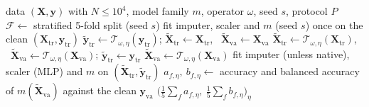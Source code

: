 \documentclass[pdflatex,sn-mathphys]{sn-jnl}
\theoremstyle{thmstyleone}
\theoremstyle{thmstyletwo}
\theoremstyle{thmstylethree}
\begin{document}


\begin{algorithm}[t]
\caption{Evaluation of one trajectory $(\mathcal{D},m,\omega,s)$ under Protocol~A or~B}\label{alg:cell}
\begin{algorithmic}[1]
\Require data $(\mathbf{X},\mathbf{y})$ with $N\le10^{4}$, model family $m$, operator $\omega$, seed $s$, protocol $P$
\State $\mathcal{F}\gets$ stratified 5-fold split (seed $s$)
   \State fit imputer, scaler and $m$ (seed $s$) once on the clean $(\mathbf{X}_{\mathrm{tr}},\mathbf{y}_{\mathrm{tr}})$ \EndIf
      \State $\tilde{\mathbf{y}}_{\mathrm{tr}}\gets\mathcal{T}_{\omega,\eta}(\mathbf{y}_{\mathrm{tr}})$; \quad $\tilde{\mathbf{X}}_{\mathrm{tr}}\gets\mathbf{X}_{\mathrm{tr}}$, \ $\tilde{\mathbf{X}}_{\mathrm{va}}\gets\mathbf{X}_{\mathrm{va}}$
      \State $\tilde{\mathbf{X}}_{\mathrm{tr}}\gets\mathcal{T}_{\omega,\eta}(\mathbf{X}_{\mathrm{tr}})$, \ $\tilde{\mathbf{X}}_{\mathrm{va}}\gets\mathcal{T}_{\omega,\eta}(\mathbf{X}_{\mathrm{va}})$; \quad $\tilde{\mathbf{y}}_{\mathrm{tr}}\gets\mathbf{y}_{\mathrm{tr}}$
    \Else
      \State $\tilde{\mathbf{X}}_{\mathrm{va}}\gets\mathcal{T}_{\omega,\eta}(\mathbf{X}_{\mathrm{va}})$ 
    \EndIf
     \State fit imputer (unless native), scaler (MLP) and $m$ on $(\tilde{\mathbf{X}}_{\mathrm{tr}},\tilde{\mathbf{y}}_{\mathrm{tr}})$ \EndIf
    \State $a_{f,\eta},\ b_{f,\eta}\gets$ accuracy and balanced accuracy of $m(\tilde{\mathbf{X}}_{\mathrm{va}})$ against the clean $\mathbf{y}_{\mathrm{va}}$
  \EndFor
\EndFor
\State \Return $\bigl(\tfrac15\sum_f a_{f,\eta},\ \tfrac15\sum_f b_{f,\eta}\bigr)_{\eta}$
\end{algorithmic}
\end{algorithm}
\end{document}
